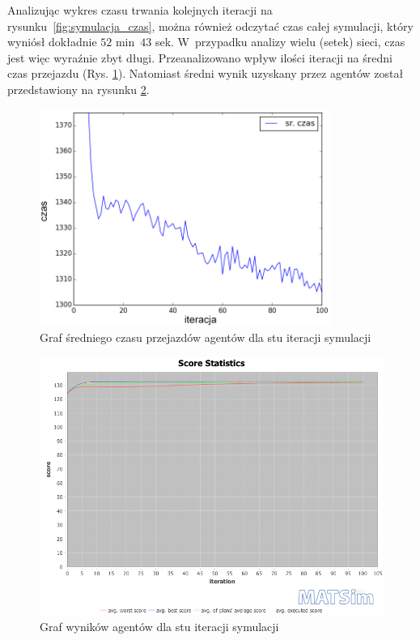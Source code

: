 \documentclass[twoside,12pt]{report}
\begin{document}
Analizując wykres czasu trwania kolejnych iteracji na rysunku~\ref{fig:symulacja_czas}, można również odczytać czas całej symulacji, który wyniósł dokładnie $52$ min~$43$ sek.  W~przypadku analizy wielu (setek) sieci, czas jest więc wyraźnie zbyt długi. Przeanalizowano wpływ ilości iteracji na średni czas przejazdu (Rys. \ref{fig:iteracje_czas}). Natomiast średni wynik uzyskany przez agentów został przedstawiony na rysunku \ref{fig:iteracje_wynik}.

\begin{figure}[htbp]
	\centering
	\includegraphics[width=0.85\textwidth]{img/def_iters}
	\caption{Graf średniego czasu przejazdów agentów dla stu iteracji symulacji}
	\label{fig:iteracje_czas}
\end{figure}

\begin{figure}[htbp]
	\centering
	\includegraphics[width=\textwidth]{img/def_scorestats}
	\caption{Graf wyników agentów dla stu iteracji symulacji}
	\label{fig:iteracje_wynik}
\end{figure}
\end{document}

